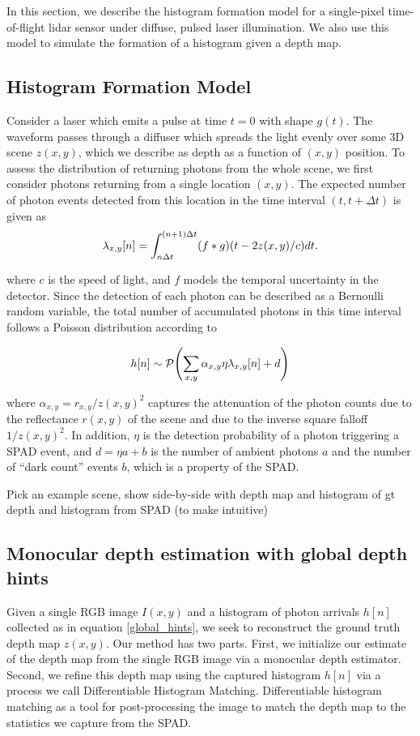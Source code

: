 In this section, we describe the histogram formation model for a single-pixel
time-of-flight lidar sensor under diffuse, pulsed laser illumination. We also use
this model to simulate the formation of a histogram given a depth map. 
\subsection{Histogram Formation Model}
Consider a laser which emits a pulse at time $t = 0$ with shape $g(t)$. The waveform passes through a diffuser
which spreads the light evenly over some 3D scene $z(x,y)$, which we describe as
depth as a function of $(x,y)$ position. 
To assess the distribution of returning photons from the whole scene, we first consider photons returning from a single
location $(x, y)$. The expected number of photon events detected 
from this location in the time interval $(t, t + \Delta t)$ is given as
\begin{equation}
  \lambda_{x,y}[n] = \int_{n\Delta t}^{(n+1) \Delta t} (f * g)\paren*{t - 2z(x,y)/c} dt. \label{single_loc_spad} 
\end{equation}  

where $c$ is the speed of light, and $f$ models the temporal uncertainty in the
detector. Since the detection of each photon can be described as a Bernoulli random variable,
the total number of accumulated photons in this time interval follows a Poisson
distribution according to

\begin{equation}
  h[n] \sim \mathcal{P}\paren*{\sum_{x,y}\alpha_{x,y}\eta \lambda_{x,y}[n] + d} \label{global_hints}
\end{equation}

where $\alpha_{x,y} = r_{x,y}/z(x,y)^2$ captures the attenuation of the
photon counts due to the reflectance $r(x,y)$ of the scene and due to the
inverse square falloff $1/z(x,y)^2$.
In addition, $\eta$ is the detection probability of a photon
triggering a SPAD event, and $d = \eta a + b$ is the number of ambient photons $a$
and the number of ``dark count'' events $b$, which is a property of the SPAD.

Pick an example scene, show side-by-side with depth map and histogram of gt
depth and histogram from SPAD (to make intuitive)

\subsection{Monocular depth estimation with global depth hints}
Given a single RGB image $I(x,y)$ and a histogram of photon arrivals $h[n]$
collected as in equation \ref{global_hints}, we seek to
reconstruct the ground truth depth map $z(x,y)$.
Our method has two parts. First, we initialize our estimate of the depth map from the single RGB
image via a monocular depth estimator. Second, we refine this depth map using
the captured histogram $h[n]$ via a process we call Differentiable Histogram Matching.
Differentiable histogram matching as a tool for post-processing the image to
match the depth map to the statistics we capture from the SPAD.

